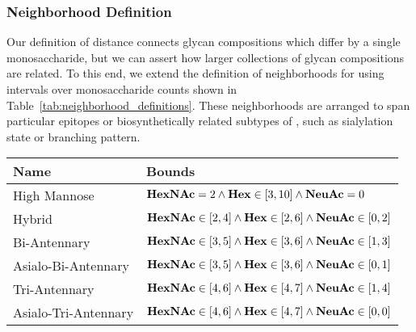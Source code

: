     \subsubsection{Neighborhood Definition}
        Our definition of distance connects glycan compositions which differ
        by a single monosaccharide, but we can assert how larger collections of
        glycan compositions are related. To this end, we extend the definition of
        neighborhoods for \nglycans using intervals over monosaccharide counts
        shown in Table~\ref{tab:neighborhood_definitions}. These neighborhoods are
        arranged to span particular epitopes or biosynthetically related
        subtypes of \nglycans, such as sialylation state or branching
        pattern.

        \begin{table}[tb]
            \centering
            \small
            \begin{tabular}[h]{l p{8cm}}
                \toprule
                Name & Bounds \\
                \midrule
                High Mannose & ${\bf HexNAc} = 2 \land
                                {\bf Hex} \in [3, 10]
                                \land {\bf NeuAc} = 0$\\
                Hybrid & ${\bf HexNAc} \in [2, 4] \land
                          {\bf Hex} \in [2, 6]
                          \land {\bf NeuAc} \in [0, 2]$\\
                Bi-Antennary & ${\bf HexNAc} \in [3, 5]
                                \land {\bf Hex} \in [3, 6]
                                \land {\bf NeuAc} \in [1, 3]$\\
                Asialo-Bi-Antennary & ${\bf HexNAc} \in [3, 5]
                                \land {\bf Hex} \in [3, 6]
                                \land {\bf NeuAc} \in [0, 1]$\\
                Tri-Antennary & $
                    {\bf HexNAc} \in [4, 6]
                    \land {\bf Hex} \in [4, 7]
                    \land {\bf NeuAc} \in [1, 4]
                $\\
                Asialo-Tri-Antennary & $
                    {\bf HexNAc} \in [4, 6]
                    \land {\bf Hex} \in [4, 7]
                    \land {\bf NeuAc} \in [0, 0]
                $\\

\end{tabular}
\end{table}
